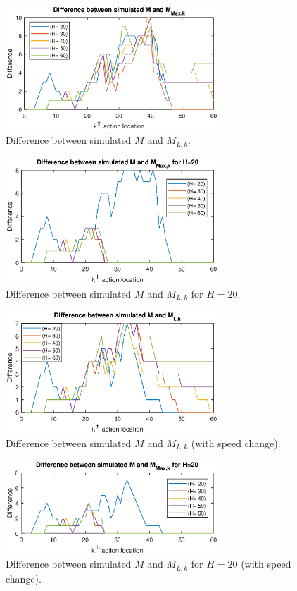 \documentclass{ifacconf}
\begin{document}
\begin{figure}[t]
\begin{center}
\includegraphics[width=8cm]{plot/7_nc.eps}
\caption{Difference between simulated $M$ and $M_{L,k}$. }
\label{fig:HMDnc}
\end{center}
\end{figure}

\begin{figure}[t]
\begin{center}
\includegraphics[width=8cm]{plot/8_nc.eps}
\caption{Difference between simulated $M$ and $M_{L,k}$ for $H=20$. }
\label{fig:HM20nc}
\end{center}
\end{figure}

\begin{figure}[t]
\begin{center}
\includegraphics[width=8cm]{plot/7.eps}
\caption{Difference between simulated $M$ and $M_{L,k}$ (with speed change).}
\label{fig:HMD}
\end{center}
\end{figure}

\begin{figure}[t]
\begin{center}
\includegraphics[width=8cm]{plot/8.eps}
\caption{Difference between simulated $M$ and $M_{L,k}$ for $H=20$ (with speed change). }
\label{fig:HM20}
\end{center}
\end{figure}
\end{document}

